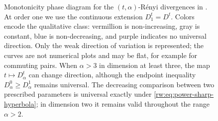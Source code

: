 \documentclass[11pt]{article}
\theoremstyle{remark}
\newcommand{\1}{\mathbbm{1}}
\begin{document}
\begin{figure}[!ht]
\caption{Monotonicity phase diagram for the $(t,\alpha)$-R\'enyi
divergences in .  At order one we
use the continuous extension $D_1^t=D^t$.  Colors encode the
qualitative class: vermillion is non-increasing, gray is constant,
blue is non-decreasing, and purple indicates no universal direction.  Only the weak direction
of variation is represented; the curves are not numerical plots and
may be flat, for example for commuting pairs.  When $\alpha>3$ in
dimension at least three, the map $t\mapsto D_\alpha^t$ can change
direction, although the endpoint inequality
$D_\alpha^0\geq D_\alpha^1$ remains universal.  The decreasing
comparison between two prescribed parameters is universal exactly under
\eqref{rw:eq:power-sharp-hyperbola}; in dimension two it remains valid
throughout the range $\alpha>2$.}
\label{rw:fig:power-t-monotonicity}
\end{figure}
\end{document}
